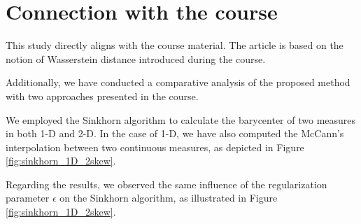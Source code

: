 \section{Connection with the course}

This study directly aligns with the course material. The article \cite{claici_stochastic_2018} is based on the notion of Wasserstein distance introduced during the course. 

Additionally, we have conducted a comparative analysis of the proposed method with two approaches presented in the course.

We employed the Sinkhorn algorithm to calculate the barycenter of two measures in both 1-D and 2-D. In the case of 1-D, we have also computed the McCann's interpolation between two continuous measures, as depicted in Figure \ref{fig:sinkhorn_1D_2skew}.

Regarding the results, we observed the same influence of the regularization parameter $\epsilon$ on the Sinkhorn algorithm, as illustrated in Figure \ref{fig:sinkhorn_1D_2skew}. 